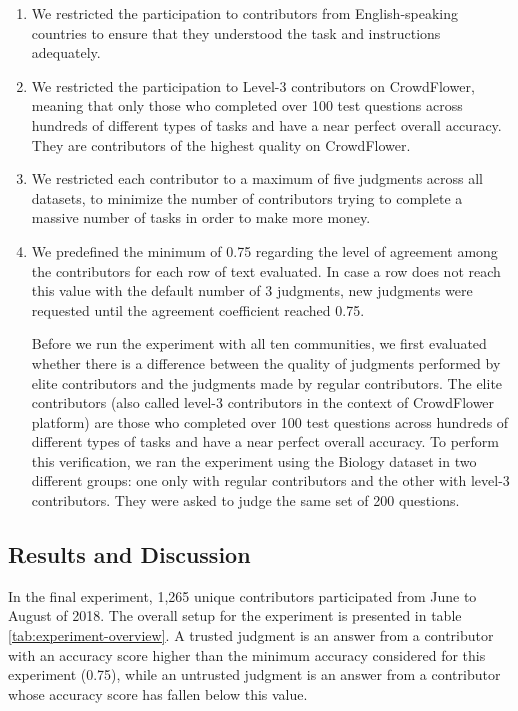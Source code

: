\begin{enumerate}

\item We restricted the participation to contributors from English-speaking countries to ensure that they understood the task and instructions adequately. 

\item We restricted the participation to Level-3 contributors on CrowdFlower, meaning that only those who completed over 100 test questions across hundreds of different types of tasks and have a near perfect overall accuracy. They are contributors of the highest quality on CrowdFlower.

\item We restricted each contributor to a maximum of five judgments across all datasets, to minimize the number of contributors trying to complete a massive number of tasks in order to make more money.

\item We predefined the minimum of 0.75 regarding the level of agreement among the contributors for each row of text evaluated. In case a row does not reach this value with the default number of 3 judgments, new judgments were requested until the agreement coefficient reached 0.75.

Before we run the experiment with all ten communities, we first evaluated whether there is a difference between the quality of judgments performed by elite contributors and the judgments made by regular contributors. The elite contributors (also called level-3 contributors in the context of CrowdFlower platform) are those who completed over 100 test questions across hundreds of different types of tasks and have a near perfect overall accuracy. To perform this verification, we ran the experiment using the Biology dataset in two different groups: one only with regular contributors and the other with level-3 contributors. They were asked to judge the same set of 200 questions. 

\end{enumerate}

\subsection{\hspace*{3pt} Results and Discussion}

In the final experiment, 1,265 unique contributors participated from June to August of 2018. The overall setup for the experiment is presented in table \ref{tab:experiment-overview}. A trusted judgment is an answer from a contributor with an accuracy score higher than the minimum accuracy considered for this experiment (0.75), while an untrusted judgment is an answer from a contributor whose accuracy score has fallen below this value.

